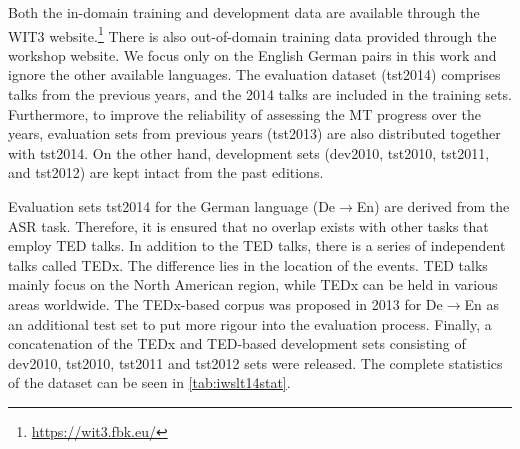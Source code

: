 Both the in-domain training and development data are available through the WIT3 website.\footnote{\url{https://wit3.fbk.eu/}} There is also out-of-domain training data provided through the workshop website. We focus only on the English German pairs in this work and ignore the other available languages. The evaluation dataset (tst2014) comprises talks from the previous years, and the 2014 talks are included in the training sets. Furthermore, to improve the reliability of assessing the MT progress over the years, evaluation sets from previous years (tst2013) are also distributed together with tst2014. On the other hand, development sets (dev2010, tst2010, tst2011, and tst2012) are kept intact from the past editions.

Evaluation sets tst2014 for the German language (De$\rightarrow$En) are derived from the ASR task. Therefore, it is ensured that no overlap exists with other tasks that employ TED talks. In addition to the TED talks, there is a series of independent talks called TEDx. The difference lies in the location of the events. TED talks mainly focus on the North American region, while TEDx can be held in various areas worldwide. The TEDx-based corpus was proposed in 2013 for De$\rightarrow$En as an additional test set to put more rigour into the evaluation process. Finally, a concatenation of the TEDx and TED-based development sets consisting of dev2010, tst2010, tst2011 and tst2012 sets were released. The complete statistics of the dataset can be seen in \cref{tab:iwslt14stat}.

